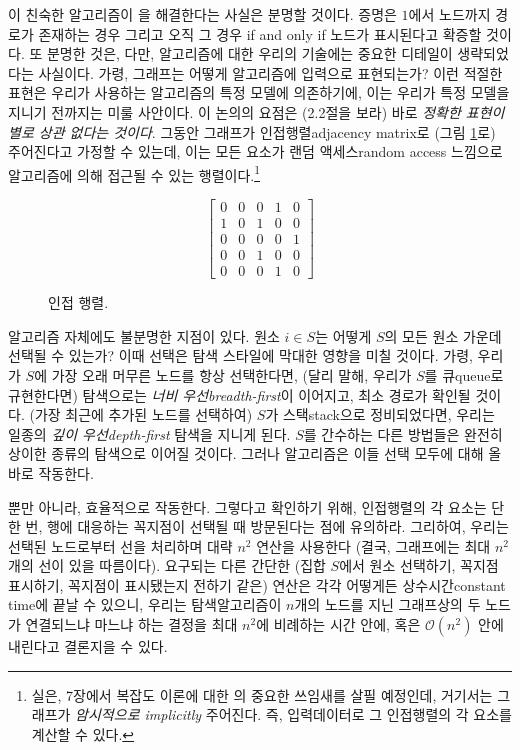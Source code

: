 \documentclass[a4paper,chapter,atbegshi,]{oblivoir}
\begin{document}
이 친숙한 알고리즘이 을 해결한다는 사실은 분명할 것이다.
증명은 $1$에서 노드까지 경로가 존재하는 경우 그리고 오직 그 경우{\footnotesize
if and only if} 노드가 표시된다고 확증할 것이다. 또 분명한 것은, 다만, 
알고리즘에 대한 우리의 기술에는 중요한 디테일이 생략되었다는 사실이다. 가령,
그래프는 어떻게 알고리즘에 입력으로 표현되는가? 이런 적절한 표현은 우리가
사용하는 알고리즘의 특정 모델에 의존하기에, 이는 우리가 특정 모델을 지니기
전까지는 미룰 사안이다. 이 논의의 요점은 (2.2절을 보라) 바로 \emph{정확한 표현이
별로 상관 없다는 것이다}. 그동안 그래프가 인접행렬{\footnotesize adjacency
matrix}로 (그림 \ref{fig:1-2}로) 주어진다고 가정할 수 있는데, 이는 모든 요소가
랜덤 액세스{\footnotesize random access} 느낌으로 알고리즘에 의해 접근될 수 있는
행렬이다.\footnote[2]{실은, 7장에서 복잡도 이론에 대한 의
중요한 쓰임새를 살필 예정인데, 거기서는 그래프가 \emph{암시적으로\footnotesize 
implicitly} 주어진다. 즉, 입력데이터로 그 인접행렬의 각 요소를 계산할 수 있다.} 

\begin{figure}[h]
  \[
    \begin{bmatrix}
      0 & 0 & 0 & 1 & 0 \\
      1 & 0 & 1 & 0 & 0 \\
      0 & 0 & 0 & 0 & 1 \\
      0 & 0 & 1 & 0 & 0 \\
      0 & 0 & 0 & 1 & 0
    \end{bmatrix}
  \]
    \caption{\label{fig:1-2}인접 행렬.}
\end{figure}

알고리즘 자체에도 불분명한 지점이 있다. 원소 $i\in S$는 어떻게 $S$의 모든 원소
가운데 선택될 수 있는가? 이때 선택은 탐색 스타일에 막대한 영향을 미칠 
것이다. 가령, 우리가 $S$에 가장 오래 머무른 노드를 항상 선택한다면, (달리 말해,
우리가 $S$를 큐{\footnotesize queue}로 규현한다면) 탐색으로는 \emph{너비
우선\footnotesize breadth-first}이 이어지고, 최소 경로가 확인될 것이다. (가장
최근에 추가된 노드를 선택하여) $S$가 스택{\footnotesize stack}으로 정비되었다면, 
우리는 일종의 \emph{깊이 우선\footnotesize depth-first} 탐색을 지니게 된다.
$S$를 간수하는 다른 방법들은 완전히 상이한 종류의 탐색으로 이어질 것이다.
그러나 알고리즘은 이들 선택 모두에 대해 올바로 작동한다. 

뿐만 아니라, 효율적으로 작동한다. 그렇다고 확인하기 위해, 인접행렬의 
각 요소는 단 한 번, 행에 대응하는 꼭지점이 선택될 때 방문된다는 점에 유의하라.
그리하여, 우리는 선택된 노드로부터 선을 처리하며 대략 $n^2$ 연산을 사용한다
(결국, 그래프에는 최대 $n^2$개의 선이 있을 따름이다). 요구되는 다른 간단한
(집합 $S$에서 원소 선택하기, 꼭지점 표시하기, 꼭지점이 표시됐는지 전하기 같은)
연산은 각각 어떻게든 상수시간{\footnotesize constant time}에 끝날 수 있으니,
우리는 탐색알고리즘이 $n$개의 노드를 지닌 그래프상의 두 노드가 연결되느냐
마느냐 하는 결정을 최대 $n^2$에 비례하는 시간 안에, 혹은 $\mathcal{O}(n^2)$ 안에
내린다고 결론지을 수 있다.
\end{document}
